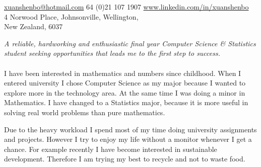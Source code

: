\documentclass[10pt,a4paper]{article}
\begin{document}
\sloppy  %



\nobreakvspace{0.3em}  %

\noindent\href{mailto:xuanshenbo@hotmail.com}{xuanshenbo\mbox{}@\mbox{}hotmail.com}\sbull
\textsmaller{+}64 (0)21 107 1907\sbull
\href{http://www.linkedin.com/in/xuanshenbo}{www.linkedin.com/in/xuanshenbo}
\\
4 Norwood Place, Johnsonville, Wellington, \\New Zealand, 6037

\spacedhrule{0.9em}{-0.4em}  %


\vspace{-1.3em}  %
\begin{multicols}{2}  %
\noindent \emph{A reliable, hardworking and enthusiastic final year Computer Science \& Statistics student seeking opportunities that leads me to the first step to success.}
\\
\\

I have been interested in mathematics and numbers since childhood. When I entered university I chose Computer Science as my major because I wanted to explore more in the technology area. At the same time I 
was doing a minor in Mathematics. I have changed to a Statistics major, because it is more useful in solving real world problems than pure mathematics.

Due to the heavy workload I spend most of my time doing university assignments and projects. However I try to enjoy my life without a monitor whenever 
I get a chance. For example recently I have become interested in sustainable development. Therefore I am trying my best to 
recycle and not to waste food.

\end{multicols}
\end{document}
